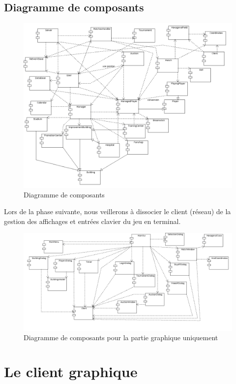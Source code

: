 \documentclass[a4paper,titlepage]{scrreprt}
\begin{document}
\subsection{Diagramme de composants}
      \begin{figure}[H]
    \center
    \includegraphics[scale=0.4]{uml/Diagrammededeploiement.png}
    \caption{Diagramme de composants}
    \end{figure}
    Lors de la phase suivante, nous veillerons à dissocier le client (réseau) de la gestion des affichages et entrées clavier du jeu en terminal.
    \begin{figure}[H]
    \center
    \includegraphics[scale=0.3]{uml/GUIComponents.png}
    \caption{Diagramme de composants pour la partie graphique uniquement}
    \end{figure}
\newpage

\section{Le client graphique} \label{diag-client-graphique}
\end{document}
